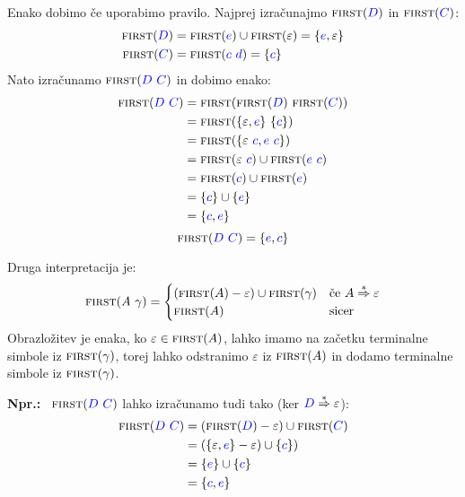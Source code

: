 \documentclass{article}
\newcommand{\Ex}{\textbf{Npr.:}\ }
\newcommand{\FIRST}{\textsc{first}}
\newcommand{\Symbol}[1]{\textcolor{blue}{#1}}
\newcommand{\Null}{\varepsilon}
\newcommand{\DeriveStar}{\overset{\ast}{\Rightarrow}}
\newcommand{\Seq}{\ }
\begin{document}
  Enako dobimo če uporabimo pravilo.
  Najprej izračunajmo $\FIRST(\Symbol{D})$ in $\FIRST(\Symbol{C})$:
  \begin{align*}
    \FIRST(\Symbol{D}) &= \FIRST(\Symbol{e}) \cup \FIRST(\Null) = \{\Symbol{e}, \Null\}\\
    \FIRST(\Symbol{C}) &= \FIRST(\Symbol{c} \Seq \Symbol{d}) = \{\Symbol{c}\}
  \end{align*}
  Nato izračunamo $\FIRST(\Symbol{D} \Seq \Symbol{C})$ in dobimo enako:
  \begin{equation*}
    \begin{aligned}
      \FIRST(\Symbol{D} \Seq \Symbol{C}) &= \FIRST(\FIRST(\Symbol{D}) \Seq \FIRST(\Symbol{C}))\\
                &= \FIRST(\{\Null, \Symbol{e}\} \Seq \{\Symbol{c}\})\\
                &= \FIRST(\{\Null \Seq \Symbol{c}, \Symbol{e} \Seq \Symbol{c}\})\\
                &= \FIRST(\Null \Seq \Symbol{c}) \cup \FIRST(\Symbol{e} \Seq \Symbol{c})\\
                &= \FIRST(\Symbol{c}) \cup \FIRST(\Symbol{e})\\
                &= \{\Symbol{c}\} \cup \{\Symbol{e}\}\\
                &= \{\Symbol{c}, \Symbol{e}\}
    \end{aligned}
  \end{equation*}
  \begin{equation*}
    \FIRST(\Symbol{D} \Seq \Symbol{C}) = \{\Symbol{e}, \Symbol{c}\}
  \end{equation*}

  Druga interpretacija je:
\begin{equation*}
  \FIRST(A \Seq \gamma) = \begin{cases}
    (\FIRST(A) - \Null) \cup \FIRST(\gamma) & \text{če } A \DeriveStar \Null \\
    \FIRST(A) & \text{sicer} \\
  \end{cases}
\end{equation*}
Obrazložitev je enaka, ko $\Null \in \FIRST(A)$, lahko imamo na začetku terminalne simbole iz $\FIRST(\gamma)$, torej lahko odstranimo $\Null$ iz $\FIRST(A)$ in dodamo terminalne simbole iz $\FIRST(\gamma)$.

\Ex
  $\FIRST(\Symbol{D} \Seq \Symbol{C})$ lahko izračunamo tudi tako (ker $\Symbol{D} \DeriveStar \Null$):
  \begin{equation*}
    \begin{aligned}
      \FIRST(\Symbol{D} \Seq \Symbol{C}) &= (\FIRST(\Symbol{D}) - \Null) \cup \FIRST(\Symbol{C})\\
                &= (\{\Null, \Symbol{e}\} - \Null) \cup \{\Symbol{c}\})\\
                &= \{\Symbol{e}\} \cup \{\Symbol{c}\}\\
                &= \{\Symbol{c}, \Symbol{e}\}
    \end{aligned}
  \end{equation*}
\end{document}
